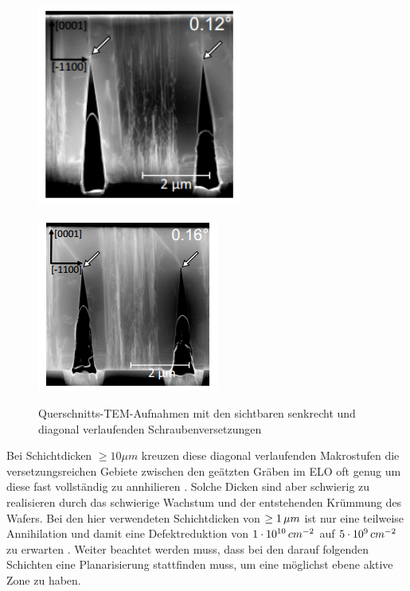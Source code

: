 \begin{figure}[htb]
  \centering
  \begin{minipage}[t]{0.49\textwidth}
    \centering
    \includegraphics[width=0.6\textwidth]{Bilder/offcutsenkrecht.png}
    \label{}
  \end{minipage}
	\hfill
  \begin{minipage}[t]{0.49\textwidth}
    \centering
    \includegraphics[width=0.6\linewidth]{Bilder/offcutdiagonal.png}
    \label{}
  \end{minipage}
	\caption{Querschnitts-TEM-Aufnahmen mit den sichtbaren senkrecht und diagonal verlaufenden Schraubenversetzungen}
	\label{schraubenvers}
\end{figure}
%
Bei Schichtdicken $ \geq 10 \mu m $ kreuzen diese diagonal verlaufenden Makrostufen die versetzungsreichen Gebiete zwischen den geätzten Gräben im ELO oft genug um diese fast vollständig zu annhilieren \cite{fmehnke}. Solche Dicken sind aber schwierig zu realisieren durch das schwierige Wachstum und der entstehenden Krümmung des Wafers. Bei den hier verwendeten Schichtdicken von $ \geq 1\thinspace \mu m $ ist nur eine teilweise Annihilation und damit eine Defektreduktion von $1\cdot 10^{10} \thinspace cm^{-2}$ auf $5\cdot 10^9 \thinspace cm^{-2}$ zu erwarten \cite{fmehnke}. Weiter beachtet werden muss, dass bei den darauf folgenden Schichten eine Planarisierung stattfinden muss, um eine möglichst ebene aktive Zone zu haben. 

